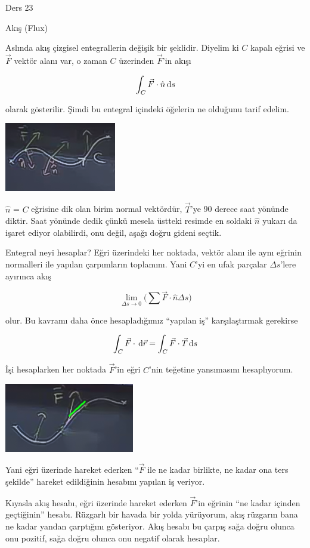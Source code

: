 \documentclass[12pt,fleqn]{article}\usepackage{../../common}
\begin{document}
Ders 23

Akış (Flux)

Aslında akış çizgisel entegrallerin değişik bir şeklidir. Diyelim ki $C$ kapalı
eğrisi ve $\vec{F}$ vektör alanı var, o zaman $C$ üzerinden $\vec{F}$'in akışı

$$ \int_C \vec{F} \cdot \hat{n} \,\mathrm{d} s $$

olarak gösterilir. Şimdi bu entegral içindeki öğelerin ne olduğunu tarif
edelim. 

\includegraphics[height=3cm]{23_1.png}

$\hat{n}$ = $C$ eğrisine dik olan birim normal vektördür, $\vec{T}$'ye 90 derece
saat yönünde diktir. Saat yönünde dedik çünkü mesela üstteki resimde en soldaki
$\hat{n}$ yukarı da işaret ediyor olabilirdi, onu değil, aşağı doğru gideni
seçtik.

Entegral neyi hesaplar? Eğri üzerindeki her noktada, vektör alanı ile aynı
eğrinin normalleri ile yapılan çarpımların toplamını. Yani $C$'yi en ufak
parçalar $\Delta s$'lere ayırınca akış

$$
\lim_{\Delta s \to 0} 
\bigg( \sum \vec{F} \cdot \hat{n}  \Delta s \bigg)
$$

olur. Bu kavramı daha önce hesapladığımız ``yapılan iş'' karşılaştırmak
gerekirse


$$ \int_C \vec{F} \cdot \,\mathrm{d}\vec{r} = \int_C \vec{F} \cdot \vec{T} \,\mathrm{d} s $$

İşi hesaplarken her noktada $\vec{F}$'in eğri $C$'nin teğetine yansımasını
hesaplıyorum. 

\includegraphics[height=3cm]{23_2.png}

Yani eğri üzerinde hareket ederken ``$\vec{F}$ ile ne kadar birlikte, ne
kadar ona ters şekilde'' hareket edildiğinin hesabını yapılan iş veriyor. 

Kıyasla akış hesabı, eğri üzerinde hareket ederken $\vec{F}$'in eğrinin ``ne
kadar içinden geçtiğinin'' hesabı. Rüzgarlı bir havada bir yolda yürüyorum, akış
rüzgarın bana ne kadar yandan çarptığını gösteriyor. Akış hesabı bu çarpış sağa
doğru olunca onu pozitif, sağa doğru olunca onu negatif olarak hesaplar.
\end{document}
